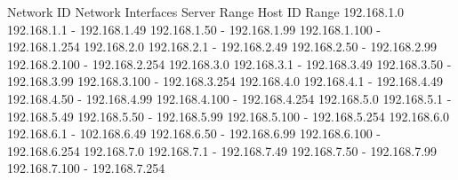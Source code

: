 \markdownRendererInterblockSeparator
{}%
{{Network ID}%
{Network Interfaces}%
{Server Range}%
{Host ID Range}%
}%
{{192.168.1.0}%
{192.168.1.1 - 192.168.1.49}%
{192.168.1.50 - 192.168.1.99}%
{192.168.1.100 - 192.168.1.254}%
}%
{{192.168.2.0}%
{192.168.2.1 - 192.168.2.49}%
{192.168.2.50 - 192.168.2.99}%
{192.168.2.100 - 192.168.2.254}%
}%
{{192.168.3.0}%
{192.168.3.1 - 192.168.3.49}%
{192.168.3.50 - 192.168.3.99}%
{192.168.3.100 - 192.168.3.254}%
}%
{{192.168.4.0}%
{192.168.4.1 - 192.168.4.49}%
{192.168.4.50 - 192.168.4.99}%
{192.168.4.100 - 192.168.4.254}%
}%
{{192.168.5.0}%
{192.168.5.1 - 192.168.5.49}%
{192.168.5.50 - 192.168.5.99}%
{192.168.5.100 - 192.168.5.254}%
}%
{{192.168.6.0}%
{192.168.6.1 - 102.168.6.49}%
{192.168.6.50 - 192.168.6.99}%
{192.168.6.100 - 192.168.6.254}%
}%
{{192.168.7.0}%
{192.168.7.1 - 192.168.7.49}%
{192.168.7.50 - 192.168.7.99}%
{192.168.7.100 - 192.168.7.254}%
}%
\relax
